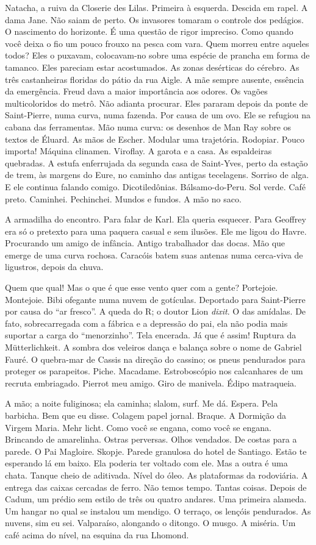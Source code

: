 Natacha, a ruiva da Closerie des Lilas. Primeira à esquerda. Descida em
rapel. A dama Jane. Não saiam de perto. Os invasores tomaram o controle
dos pedágios. O nascimento do horizonte. É uma questão de rigor
impreciso. Como quando você deixa o fio um pouco frouxo na pesca com
vara. Quem morreu entre aqueles todos? Eles o puxavam, colocavam-no
sobre uma espécie de prancha em forma de tamanco. Eles pareciam estar
acostumados. As zonas desérticas do cérebro. As três castanheiras
floridas do pátio da rua Aigle. A mãe sempre ausente, essência da
emergência. Freud dava a maior importância aos odores. Os vagões
multicoloridos do metrô. Não adianta procurar. Eles pararam depois da
ponte de Saint-Pierre, numa curva, numa fazenda. Por causa de um ovo.
Ele se refugiou na cabana das ferramentas. Mão numa curva: os desenhos
de Man Ray sobre os textos de Éluard. As mãos de Escher. Modular uma
trajetória. Rodopiar. Pouco importa! Máquina clinamen. Viroflay. A
garota e a casa. As espaldeiras quebradas. A estufa enferrujada da
segunda casa de Saint-Yves, perto da estação de trem, às margens do
Eure, no caminho das antigas tecelagens. Sorriso de alga. E ele continua
falando comigo. Dicotiledônias. Bálsamo-do-Peru. Sol verde. Café preto.
Caminhei. Pechinchei. Mundos e fundos. A mão no saco.

A armadilha do encontro. Para falar de Karl. Ela queria esquecer. Para
Geoffrey era só o pretexto para uma paquera casual e sem ilusões. Ele me
ligou do Havre. Procurando um amigo de infância. Antigo trabalhador das
docas. Mão que emerge de uma curva rochosa. Caracóis batem suas antenas
numa cerca-viva de ligustros, depois da chuva.

Quem que qual! Mas o que é que esse vento quer com a gente? Portejoie.
Montejoie. Bibi ofegante numa nuvem de gotículas. Deportado para
Saint-Pierre por causa do ``ar fresco''. A queda do R; o doutor Lion
\emph{dixit}. O das amídalas. De fato, sobrecarregada com a fábrica e a
depressão do pai, ela não podia mais suportar a carga do ``menorzinho''.
Tela encerada. Já que é assim! Ruptura da Mütterlichkeit. A sombra dos
veleiros dança e balança sobre o nome de Gabriel Fauré. O quebra-mar de
Cassis na direção do cassino; os pneus pendurados para proteger os
parapeitos. Piche. Macadame. Estroboscópio nos calcanhares de um recruta
embriagado. Pierrot meu amigo. Giro de manivela. Édipo matraqueia.

A mão; a noite fuliginosa; ela caminha; slalom, surf. Me dá. Espera.
Pela barbicha. Bem que eu disse. Colagem papel jornal. Braque. A
Dormição da Virgem Maria. Mehr licht. Como você se engana, como você se
engana. Brincando de amarelinha. Ostras perversas. Olhos vendados. De
costas para a parede. O Pai Magloire. Skopje. Parede granulosa do hotel
de Santiago. Estão te esperando lá em baixo. Ela poderia ter voltado com
ele. Mas a outra é uma chata. Tanque cheio de aditivada. Nível do óleo.
As plataformas da rodoviária. A entrega das caixas cercadas de ferro.
Não temos tempo. Tantas coisas. Depois de Cadum, um prédio sem estilo de
três ou quatro andares. Uma primeira alameda. Um hangar no qual se
instalou um mendigo. O terraço, os lençóis pendurados. As nuvens, sim eu
sei. Valparaíso, alongando o ditongo. O musgo. A miséria. Um café acima
do nível, na esquina da rua Lhomond.

